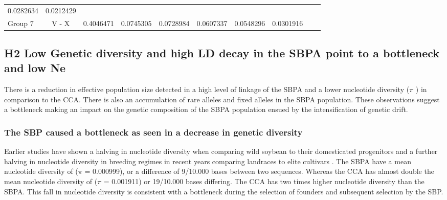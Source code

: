 \documentclass[9pt, twocolumn,twoside]{gsajnl}
\begin{document}
\begin{table}
\begin{table}
\begin{tableminipage}{\textwidth}
\begin{tabular}{|l|c|l|l|l|l|l|l|l|l}
  \cellcolor[HTML]{FBA576}0.0282634 &
  \cellcolor[HTML]{FA9172}0.0212429 &
  \cellcolor[HTML]{E7E6E6} &
  \cellcolor[HTML]{E7E6E6} &
   \\ \cline{1-9}
Group 7 &
  V - X &
  \cellcolor[HTML]{63BE7B}0.4046471 &
  \cellcolor[HTML]{F6E984}0.0745305 &
  \cellcolor[HTML]{F7E984}0.0728984 &
  \cellcolor[HTML]{FCEB84}0.0607337 &
  \cellcolor[HTML]{FFEB84}0.0548296 &
  \cellcolor[HTML]{FBAA77}0.0301916 &
  \cellcolor[HTML]{E7E6E6} &
   \\ \cline{1-9}
\end{tabular}
  \label{tab:fst2}
\end{tableminipage}
\end{table}
\end{table}



\subsection{H2 Low Genetic diversity and high LD decay in the SBPA point to a bottleneck and low Ne} 
There is a reduction in effective population size detected in a high level of linkage of the SBPA and a lower nucleotide diversity ($\pi$ ) in comparison to the CCA. There is also an accumulation of rare alleles and fixed alleles in the SBPA population. These observations suggest a bottleneck making an impact on the genetic composition of the SBPA population ensued by the intensification of genetic drift. 

\subsubsection{The SBP caused a bottleneck as seen in a decrease in genetic diversity }
Earlier studies have shown a halving in nucleotide diversity when comparing wild soybean to their domesticated progenitors and a further halving in nucleotide diversity in breeding regimes in recent years comparing landraces to elite cultivars \cite{kim21}. The SBPA have a mean nucleotide diversity of ($\pi$ = 0.000999), or a difference of  9/10.000 bases between two sequences. Whereas the CCA has almost double the mean nucleotide diversity of  ($\pi$ = 0.001911) or 19/10.000 bases differing.  The CCA has two times higher nucleotide diversity than the SBPA. This fall in nucleotide diversity is consistent with a bottleneck during the selection of founders and subsequent selection by the SBP.  
\end{document}
